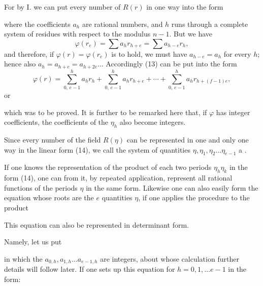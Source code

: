 

For by I. we can put every number of $R(r)$ in one way into the form


where the coefficients $a_h$ are rational numbers, and $h$ runs through a complete system of residues with respect to the modulus $n - 1$. But we have
\[
\varphi(r_e) = \sum a_h r_{h+e} = \sum a_{h-e} r_h,
\]
and therefore, if $\varphi(r) = \varphi(r_e)$ is to hold, we must have $a_{h-e} = a_h$ for every $h$; hence also $a_h = a_{h+e} = a_{h+2e} \ldots$ Accordingly (13) can be put into the form
\[
\varphi(r) = \sum_{0,\,e-1}^{h} a_h r_h + \sum_{0,\,e-1}^{h} a_h r_{h+e} + \cdots + \sum_{0,\,e-1}^{h} a_h r_{h+(f-1)e},
\]
or


which was to be proved. It is further to be remarked here that, if $\varphi$ has integer coefficients, the coefficients of the $\eta_h$ also become integers.

Since every number of the field $R(\eta)$ can be represented in one and only one way in the linear form (14), we call the system of quantities $\eta, \eta_1, \eta_2 \ldots \eta_{e-1}$ a .

If one knows the representation of the product of each two periods $\eta_h \eta_k$ in the form (14), one can from it, by repeated application, represent all rational functions of the periods $\eta$ in the same form. Likewise one can also easily form the equation whose roots are the $e$ quantities $\eta$, if one applies the procedure to the product


This equation can also be represented in determinant form.

Namely, let us put


in which the $a_{0,h}, a_{1,h} \ldots a_{e-1,h}$ are integers, about whose calculation further details will follow later. If one sets up this equation for $h = 0, 1, \ldots e - 1$ in the form:
